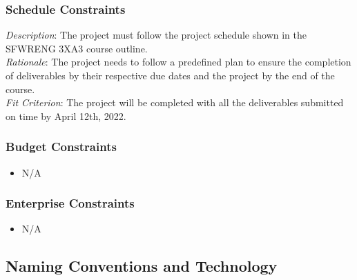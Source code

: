\documentclass[12pt, titlepage]{article}
\begin{document}
\subsubsection{Schedule Constraints}

\emph{Description}: The project must follow the project schedule shown in the SFWRENG 3XA3 course outline.\\
\emph{Rationale}: The project needs to follow a predefined plan to ensure the completion of deliverables by their respective due dates and the project by the end of the course.\\
\emph{Fit Criterion}: The project will be completed with all the deliverables submitted on time by April 12th, 2022. 

\subsubsection{Budget Constraints}

\begin{itemize}
  \item[] N/A
\end{itemize}

\subsubsection{Enterprise Constraints}

\begin{itemize}
  \item[] N/A
\end{itemize}

\pagebreak

\subsection{Naming Conventions and Technology}
\end{document}
